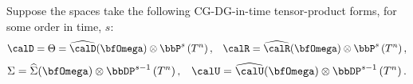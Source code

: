     \begin{example}
        Suppose the spaces take the following CG-DG-in-time tensor-product forms, for some order in time, $s$:
        \begin{align}
            \calD  =  \Theta  =  \widehat{\calD}(\bfOmega)\otimes\bbP^{s}\left(T^{n}\right),  &&
                       \calR  =  \widehat{\calR}(\bfOmega)\otimes\bbP^{s}\left(T^{n}\right),
        \end{align}
        \vspace{- 10mm}
        \begin{align}
                      \Sigma  =  \widehat{\Sigma}(\bfOmega)\otimes\bbDP^{s - 1}\left(T^{n}\right),  &&
                       \calU  =  \widehat{\calU}(\bfOmega)\otimes\bbDP^{s - 1}\left(T^{n}\right).
        \end{align}


\end{example}
